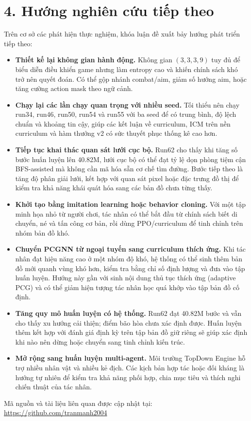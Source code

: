 \section*{4. Hướng nghiên cứu tiếp theo}

Trên cơ sở các phát hiện thực nghiệm, khóa luận đề xuất bảy hướng phát triển tiếp theo:

\begin{itemize}
    \item \textbf{Thiết kế lại không gian hành động.} Không gian $(3,3,3,9)$ tuy đủ để biểu diễn điều khiển game nhưng làm entropy cao và khiến chính sách khó trở nên quyết đoán. Có thể gộp nhánh combat/aim, giảm số hướng aim, hoặc tăng cường action mask theo ngữ cảnh.

    \item \textbf{Chạy lại các lần chạy quan trọng với nhiều seed.} Tối thiểu nên chạy run34, run46, run50, run54 và run55 với ba seed để có trung bình, độ lệch chuẩn và khoảng tin cậy, giúp các kết luận về curriculum, ICM trên nền curriculum và hàm thưởng v2 có sức thuyết phục thống kê cao hơn.

    \item \textbf{Tiếp tục khai thác quan sát lưới cục bộ.} Run62 cho thấy khi tăng số bước huấn luyện lên 40.82M, lưới cục bộ có thể đạt tỷ lệ dọn phòng tiệm cận BFS-assisted mà không cần mã hóa sẵn cơ chế tìm đường. Bước tiếp theo là tăng độ phân giải lưới, kết hợp với quan sát pixel hoặc đặc trưng đồ thị để kiểm tra khả năng khái quát hóa sang các bản đồ chưa từng thấy.

    \item \textbf{Khởi tạo bằng imitation learning hoặc behavior cloning.} Với một tập minh họa nhỏ từ người chơi, tác nhân có thể bắt đầu từ chính sách biết di chuyển, né và tấn công cơ bản, rồi dùng PPO/curriculum để tinh chỉnh trên nhóm bản đồ khó.

    \item \textbf{Chuyển PCGNN từ ngoại tuyến sang curriculum thích ứng.} Khi tác nhân đạt hiệu năng cao ở một nhóm độ khó, hệ thống có thể sinh thêm bản đồ mới quanh vùng khó hơn, kiểm tra bằng chỉ số định lượng và đưa vào tập huấn luyện. Hướng này gần với sinh nội dung thủ tục thích ứng (adaptive PCG) và có thể giảm hiện tượng tác nhân học quá khớp vào tập bản đồ cố định.

    \item \textbf{Tăng quy mô huấn luyện có hệ thống.} Run62 đạt 40.82M bước và vẫn cho thấy xu hướng cải thiện; điểm bão hòa chưa xác định được. Huấn luyện thêm kết hợp với đánh giá định kỳ trên tập bản đồ giữ riêng sẽ giúp xác định khi nào nên dừng hoặc chuyển sang tinh chỉnh kiến trúc.

    \item \textbf{Mở rộng sang huấn luyện multi-agent.} Môi trường TopDown Engine hỗ trợ nhiều nhân vật và nhiều kẻ địch. Các kịch bản hợp tác hoặc đối kháng là hướng tự nhiên để kiểm tra khả năng phối hợp, chia mục tiêu và thích nghi chiến thuật của tác nhân.
\end{itemize}

Mã nguồn và tài liệu liên quan được cập nhật tại:
\url{https://github.com/tranmanh2004}
